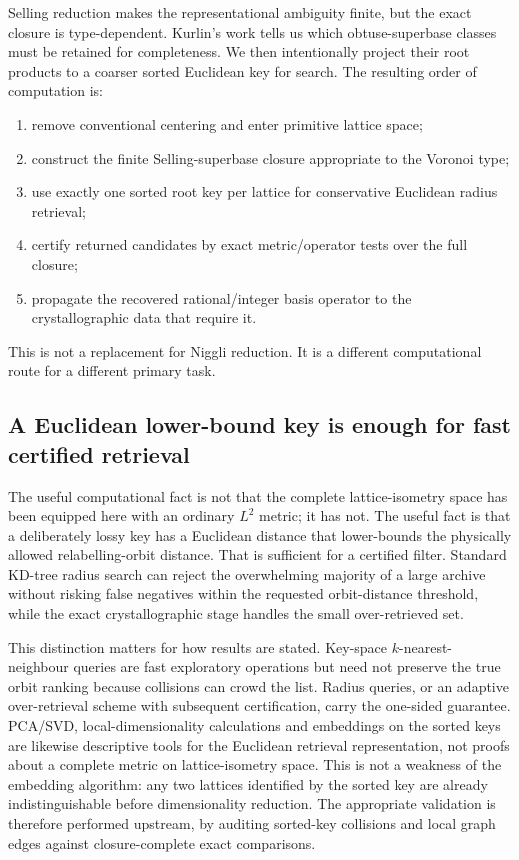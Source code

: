 \documentclass[11pt]{article}
\begin{document}
Selling reduction makes the representational ambiguity finite, but the exact closure is type-dependent. Kurlin's work tells us which obtuse-superbase classes must be retained for completeness. We then intentionally project their root products to a coarser sorted Euclidean key for search. The resulting order of computation is:
\begin{enumerate}
\item remove conventional centering and enter primitive lattice space;
\item construct the finite Selling-superbase closure appropriate to the Voronoi type;
\item use exactly one sorted root key per lattice for conservative Euclidean radius retrieval;
\item certify returned candidates by exact metric/operator tests over the full closure;
\item propagate the recovered rational/integer basis operator to the crystallographic data that require it.
\end{enumerate}
This is not a replacement for Niggli reduction. It is a different computational route for a different primary task.

\subsection{A Euclidean lower-bound key is enough for fast certified retrieval}

The useful computational fact is not that the complete lattice-isometry space has been equipped here with an ordinary $L^2$ metric; it has not. The useful fact is that a deliberately lossy key has a Euclidean distance that lower-bounds the physically allowed relabelling-orbit distance. That is sufficient for a certified filter. Standard KD-tree radius search can reject the overwhelming majority of a large archive without risking false negatives within the requested orbit-distance threshold, while the exact crystallographic stage handles the small over-retrieved set.

This distinction matters for how results are stated. Key-space $k$-nearest-neighbour queries are fast exploratory operations but need not preserve the true orbit ranking because collisions can crowd the list. Radius queries, or an adaptive over-retrieval scheme with subsequent certification, carry the one-sided guarantee. PCA/SVD, local-dimensionality calculations and embeddings on the sorted keys are likewise descriptive tools for the Euclidean retrieval representation, not proofs about a complete metric on lattice-isometry space. This is not a weakness of the embedding algorithm: any two lattices identified by the sorted key are already indistinguishable before dimensionality reduction. The appropriate validation is therefore performed upstream, by auditing sorted-key collisions and local graph edges against closure-complete exact comparisons.
\end{document}
